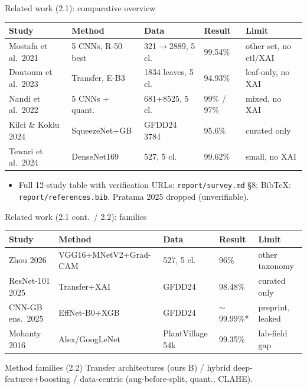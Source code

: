 \documentclass[aspectratio=169]{beamer}
\begin{document}
\begin{frame}{Related work (2.1): comparative overview}
  \scriptsize
  \begin{tabular}{lllll}
    \toprule
    Study & Method & Data & Result & Limit \\
    \midrule
    Mostafa et al.\ 2021 & 5 CNNs, R-50 best & 321$\to$2889, 5 cl.\ & 99.54\% & other set, no ctl/XAI \\
    Doutoum et al.\ 2023 & Transfer, E-B3 & 1834 leaves, 5 cl.\ & 94.93\% & leaf-only, no XAI \\
    Nandi et al.\ 2022 & 5 CNNs + quant.\ & 681+8525, 5 cl.\ & 99\% / 97\% & mixed, no XAI \\
    Kilci \& Koklu 2024 & SqueezeNet+GB & GFDD24 3784 & 95.6\% & curated only \\
    Tewari et al.\ 2024 & DenseNet169 & 527, 5 cl.\ & 99.62\% & small, no XAI \\
    \bottomrule
  \end{tabular}
  \begin{itemize}
    \item Full 12-study table with verification URLs: \texttt{report/survey.md} \S8; BibTeX: \texttt{report/references.bib}. Pratama 2025 dropped (unverifiable).
  \end{itemize}
\end{frame}
\begin{frame}{Related work (2.1 cont.\ / 2.2): families}
  \scriptsize
  \begin{tabular}{lllll}
    \toprule
    Study & Method & Data & Result & Limit \\
    \midrule
    Zhou 2026 & VGG16+MNetV2+Grad-CAM & 527, 5 cl.\ & 96\% & other taxonomy \\
    ResNet-101 2025 & Transfer+XAI & GFDD24 & 98.48\% & curated only \\
    CNN-GB ens.\ 2025 & EffNet-B0+XGB & GFDD24 & $\sim$99.99\%* & preprint, leaked \\
    Mohanty 2016 & Alex/GoogLeNet & PlantVillage 54k & 99.35\% & lab-field gap \\
    \bottomrule
  \end{tabular}
  \begin{block}{Method families (2.2)}
    \footnotesize Transfer architectures (ours B) \quad / \quad hybrid deep-features+boosting \quad / \quad data-centric (aug-before-split, quant., CLAHE).
  \end{block}
\end{frame}
\end{document}
